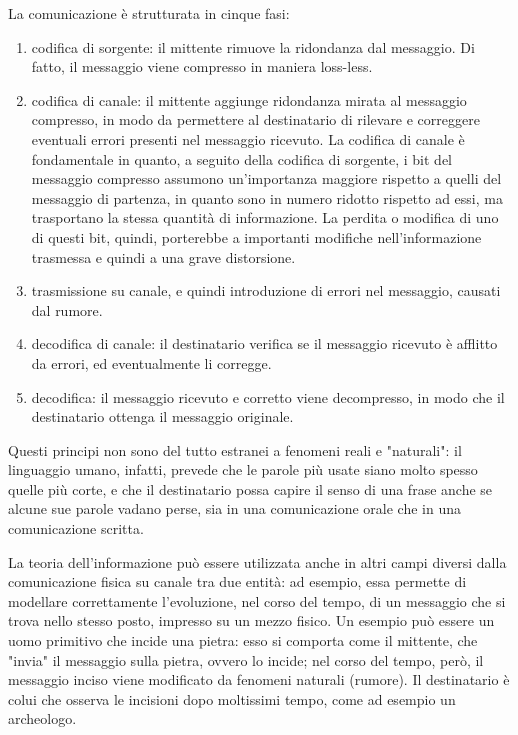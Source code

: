 La comunicazione è strutturata in cinque fasi:
\begin{enumerate}
    \item codifica di sorgente: il mittente rimuove la ridondanza dal messaggio.
    Di fatto, il messaggio viene compresso in maniera loss-less.
    \item codifica di canale: il mittente aggiunge ridondanza mirata al messaggio
    compresso, in modo da permettere al destinatario di rilevare e correggere
    eventuali errori presenti nel messaggio ricevuto.
    La codifica di canale è fondamentale in quanto, a seguito della
    codifica di sorgente, i bit del messaggio compresso assumono un'importanza
    maggiore rispetto a quelli del messaggio di partenza, in quanto sono
    in numero ridotto rispetto ad essi, ma trasportano la stessa quantità di
    informazione. La perdita o modifica di uno di questi bit, quindi,
    porterebbe a importanti modifiche nell'informazione trasmessa e quindi
    a una grave distorsione.
    \item trasmissione su canale, e quindi introduzione di errori nel messaggio,
    causati dal rumore.
    \item decodifica di canale: il destinatario verifica se il messaggio ricevuto
    è afflitto da errori, ed eventualmente li corregge.
    \item decodifica: il messaggio ricevuto e corretto viene decompresso,
    in modo che il destinatario ottenga il messaggio originale.
\end{enumerate}

Questi principi non sono del tutto estranei a fenomeni reali e "naturali":
il linguaggio umano, infatti, prevede che le parole più usate siano
molto spesso quelle più corte, e che il destinatario possa capire il senso
di una frase anche se alcune sue parole vadano perse, sia in una comunicazione
orale che in una comunicazione scritta.

La teoria dell'informazione può essere utilizzata anche in altri campi
diversi dalla comunicazione fisica su canale tra due entità: ad esempio,
essa permette di modellare correttamente l'evoluzione, nel corso del tempo,
di un messaggio che si trova nello stesso posto, impresso su un mezzo fisico.
Un esempio può essere un uomo primitivo che incide una pietra: esso si comporta
come il mittente, che "invia" il messaggio sulla pietra, ovvero lo incide;
nel corso del tempo, però, il messaggio inciso viene modificato da fenomeni
naturali (rumore). Il destinatario è colui che osserva le incisioni dopo
moltissimi tempo, come ad esempio un archeologo.
